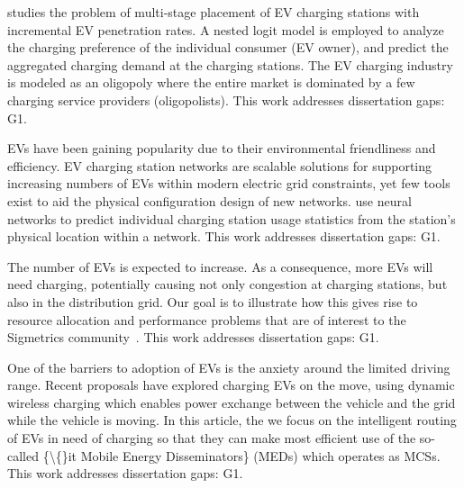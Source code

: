 \documentclass[letterpaper, 12pt, oneside, doublespacing]{Thesis}
\begin{document}
\noindent \cite{a_consumer_2018} studies the problem of multi-stage placement of EV charging stations with incremental EV penetration rates. A nested logit model is employed to analyze the charging preference of the individual consumer (EV owner), and predict the aggregated charging demand at the charging stations. The EV charging industry is modeled as an oligopoly where the entire market is dominated by a few charging service providers (oligopolists). This work addresses dissertation gaps: G1.



\noindent EVs have been gaining popularity due to their environmental friendliness and efficiency. EV charging station networks are scalable solutions for supporting increasing numbers of EVs within modern electric grid constraints, yet few tools exist to aid the physical configuration design of new networks. \cite{predicting_electric_2018} use neural networks to predict individual charging station usage statistics from the station's physical location within a network. This work addresses dissertation gaps: G1.



\noindent The number of EVs is expected to increase. As a consequence, more EVs will need charging, potentially causing not only congestion at charging stations, but also in the distribution grid. Our goal is to illustrate how this gives rise to resource allocation and performance problems that are of interest to the Sigmetrics community~\cite{electric_vehicle_2017}. This work addresses dissertation gaps: G1.



\noindent One of the barriers to adoption of EVs is the anxiety around the limited driving range. Recent proposals have explored charging EVs on the move, using dynamic wireless charging which enables power exchange between the vehicle and the grid while the vehicle is moving. In this article, the we \cite{route_optimization_2017} focus on the intelligent routing of EVs in need of charging so that they can make most efficient use of the so-called \{\textbackslash\{\}it Mobile Energy Disseminators\} (MEDs) which operates as MCSs. This work addresses dissertation gaps: G1.
\end{document}
